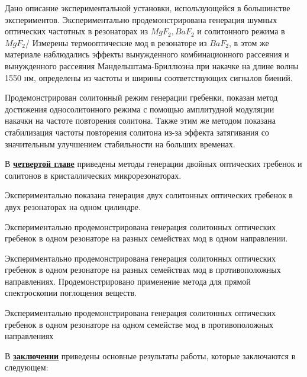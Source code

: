 Дано описание экспериментальной установки, использующейся в большинстве экспериментов. Экспериментально продемонстрирована генерация шумных оптических частотных в резонаторах из $MgF_2,BaF_2$ и солитонного режима в $MgF_2$/ Измерены термооптические мод в резонаторе из $BaF_2$, в этом же материале наблюдались эффекты вынужденного комбинационного рассеяния и вынужденного рассеяния Мандельштама-Бриллюэна при накачке на длине волны 1550 нм, определены из частоты и ширины соответствующих сигналов биений.

Продемонстрирован солитонный режим генерации гребенки, показан метод достижения односолитонного режима с помощью амплитудной модуляции накачки на частоте повторения солитона. Также этим же методом показана стабилизация частоты повторения солитона из-за эффекта затягивания со значительным улучшением стабильности на больших временах.


В \underline{\textbf{четвертой главе}} приведены методы генерации двойных оптических гребенок и солитонов в кристаллических микрорезонаторах.

Экспериментально показана генерация двух солитонных оптических гребенок в двух резонаторах на одном цилиндре.

Экспериментально продемонстрирована генерация солитонных оптических гребенок в одном резонаторе на разных семействах мод в одном направлении.

Экспериментально продемонстрирована генерация солитонных оптических гребенок в одном резонаторе на разных семействах мод в противоположных направлениях. Продемонстрировано применение метода для прямой спектроскопии поглощения веществ.

Экспериментально продемонстрирована генерация солитонных оптических гребенок в одном резонаторе на одном семействе мод в противоположных направлениях

В \underline{\textbf{заключении}} приведены основные результаты работы, которые заключаются в следующем:




